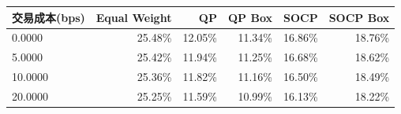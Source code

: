 \begin{center}
\small
\begin{tabular}{lrrrrr}
\toprule
交易成本(bps) & Equal Weight & QP & QP Box & SOCP & SOCP Box \\
\midrule
0.0000 & 25.48\% & 12.05\% & 11.34\% & 16.86\% & 18.76\% \\
5.0000 & 25.42\% & 11.94\% & 11.25\% & 16.68\% & 18.62\% \\
10.0000 & 25.36\% & 11.82\% & 11.16\% & 16.50\% & 18.49\% \\
20.0000 & 25.25\% & 11.59\% & 10.99\% & 16.13\% & 18.22\% \\
\bottomrule
\end{tabular}
\end{center}